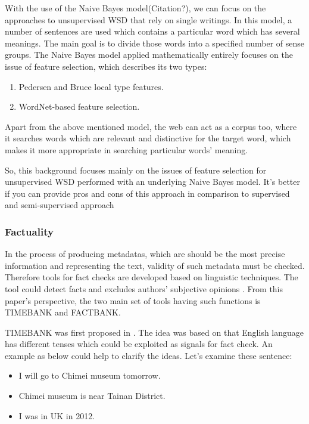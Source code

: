 With the use of the Naive Bayes model(Citation?), we can focus on the approaches to unsupervised WSD that rely on single writings. In this model, a number of sentences are used which contains a particular word which has several meanings. The main goal is to divide those words into a specified number of sense groups.
The Naive Bayes model applied mathematically entirely focuses on the issue of feature selection, which describes its two types:

\begin{enumerate}
	\item Pedersen and Bruce local type features.
	\item WordNet-based feature selection.
\end{enumerate}

Apart from the above mentioned model, the web can act as a corpus too, where it searches words which are relevant and distinctive for the target word, which makes it more appropriate in searching particular words' meaning.

So, this background focuses mainly on the issues of feature selection for unsupervised WSD performed with an underlying Naive Bayes model. It's better if you can provide pros and cons of this approach in comparison to supervised and semi-supervised approach

\subsubsection*{Factuality}
In the process of producing metadatas, which are should be the most precise information and representing the text, validity of such metadata must be checked. Therefore tools for fact checks are developed based on linguistic techniques.  The tool could detect facts and excludes authors' subjective opinions \cite{agerri2015big}. From this paper's perspective, the two main set of tools having such functions is TIMEBANK and FACTBANK.

TIMEBANK was first proposed in \cite{pustejovsky2003timebank}. The idea was based on that English language has different tenses which could be exploited as signals for fact check. An example as below could help to clarify the ideas. Let's examine these sentence:

\begin{itemize}
	\item I will go to Chimei museum tomorrow.
	\item Chimei museum is near Tainan District.
	\item I was in UK in 2012.
\end{itemize}


